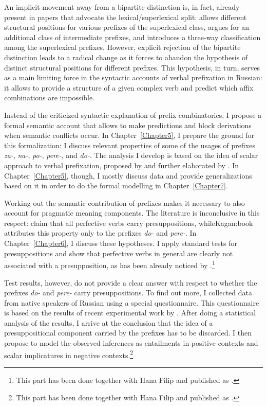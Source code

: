 An implicit movement away from a bipartite distinction is, in fact, already present in papers that advocate the lexical/superlexical split: \citet{Svenonius:04b} allows different structural positions for various prefixes of the superlexical class, \citet{Tatevosov:07} argues for an additional class of intermediate prefixes, and \citet{Tatevosov:09} introduces a three-way classification among the superlexical prefixes. However, explicit rejection of the bipartite distinction leads to a radical change as it forces to abandon the hypothesis of distinct structural positions for different prefixes. This hypothesis, in turn, serves as a main limiting force in the syntactic accounts of verbal prefixation in Russian: it allows to provide a structure of a given complex verb and predict which affix combinations are impossible.

Instead of the criticized syntactic explanation of prefix combinatorics, I propose a formal semantic account that allows to make predictions and block derivations when semantic conflicts occur. In Chapter~\ref{Chapter5}, I prepare the ground for this formalization: I discuss relevant properties of some of the usages of prefixes \textit{\mbox{za-}}, \textit{na-}, \textit{po-}, \textit{pere-}, and \textit{do-}. The analysis I develop is based on the idea of scalar approach to verbal prefixation, proposed by \citet{Filip:08} and further elaborated by \citet{Kagan:12, Kagan:book}. In Chapter~\ref{Chapter5}, though, I mostly discuss data and provide generalizations based on it in order to do the formal modelling in Chapter~\ref{Chapter7}.

Working out the semantic contribution of prefixes makes it necessary to also account for pragmatic meaning components. The literature is inconclusive in this respect: \citep{Paducheva:96, Romanova:06} claim that all perfective verbs carry presuppositions, while{Kagan:book} attributes this property only to the prefixes \textit{do-} and \textit{pere-}. In Chapter~\ref{Chapter6}, I discuss these hypotheses. I apply standard tests for presuppositions and show that perfective verbs in general are clearly not associated with a presupposition, as has been already noticed by \citet{Gronn:04}.\footnote{This part has been done together with Hana Filip and published as \citealt{ZinovaFilip:14}.}

Test results, however, do not provide a clear answer with respect to whether the prefixes \textit{do-} and \textit{pere-} carry presuppositions. To find out more, I collected data from native speakers of Russian using a special questionnaire. This questionnaire is based on the results of recent experimental work by \citet{Chemla:09}. After doing a statistical analysis of the results, I arrive at the conclusion that the idea of a presuppositional component carried by the prefixes has to be discarded. I then propose to model the observed inferences as entailments in positive contexts and scalar implicatures in negative contexts.\footnote{This part has been done together with Hana Filip and published as \citealt{ZinovaFilip:SALT}.}

